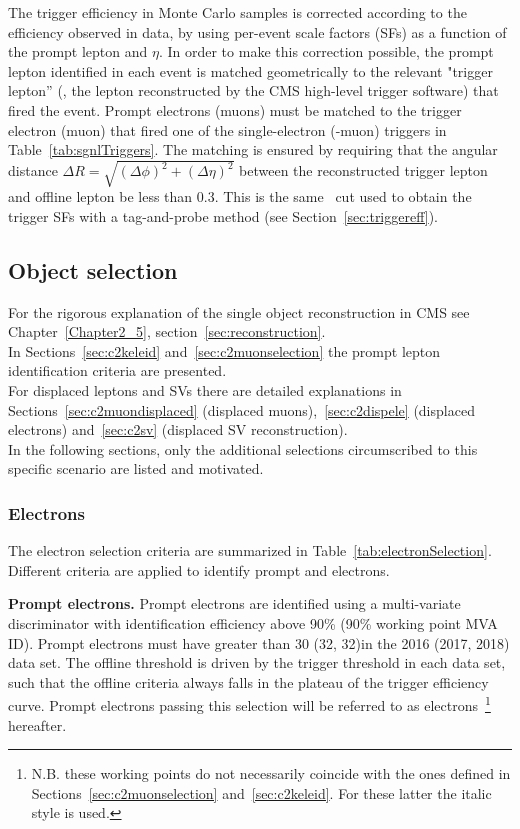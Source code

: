 The trigger efficiency in  Monte Carlo samples is corrected
according to the efficiency observed in data, by using per-event scale
factors (SFs) as a function of the prompt lepton \pt and $\eta$.
In order to make this correction possible, the prompt lepton
identified in each event is matched geometrically to the relevant
"trigger lepton'' (\ie, the lepton reconstructed by the CMS
high-level trigger software) that fired the event. Prompt electrons
(muons) must be matched to the trigger electron (muon) that fired one
of the single-electron (-muon) triggers in
Table~\ref{tab:sgnlTriggers}.
The matching is ensured by requiring that the angular distance
\(\Delta R=\sqrt{\left(\Delta\phi\right)^2+\left(\Delta\eta\right)^2}\) 
between the reconstructed trigger lepton and offline lepton be less
than 0.3. This is the same \DR\ cut used to obtain the trigger SFs
with a tag-and-probe method (see Section~\ref{sec:triggereff}).

\subsection{Object selection}\label{sec:llobject}
For the rigorous explanation of the single object reconstruction in
CMS see Chapter~\ref{Chapter2_5}, section~\ref{sec:reconstruction}.\\
In Sections~\ref{sec:c2keleid} and~\ref{sec:c2muonselection} the
prompt lepton identification criteria are presented.\\
For displaced
leptons and SVs there are detailed explanations in
Sections~\ref{sec:c2muondisplaced} (displaced
muons),~\ref{sec:c2dispele} (displaced electrons) and~\ref{sec:c2sv}
(displaced SV reconstruction).\\

In the following sections, only the
additional selections circumscribed
to this specific scenario are listed and motivated.

\subsubsection{Electrons}\label{sec:llelectron}
The electron selection criteria are summarized in
Table~\ref{tab:electronSelection}. 
Different criteria are applied to identify prompt and \displ
electrons.

\textbf {Prompt electrons.}
Prompt electrons are identified using a multi-variate discriminator with identification efficiency above 90\%
(90\% working point MVA ID). Prompt electrons
must have \pt greater than 30 (32, 32)\GeV in the 2016 (2017, 2018)
data set.
The offline \pt threshold is driven by the trigger \pt threshold in
each data set, such that the offline criteria always falls in the plateau
of the trigger efficiency curve.
Prompt electrons passing this selection will be referred to as \tP electrons~\footnote{
N.B. these working points do not necessarily coincide with the ones
defined in Sections~\ref{sec:c2muonselection}
and~\ref{sec:c2keleid}. For these latter the italic style is used.} hereafter.

